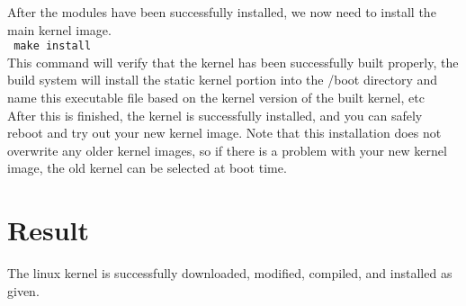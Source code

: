 \documentclass[12pt,a4paper]{article}
\begin{document}
\newline
After the modules have been successfully installed, we now need to install the main kernel image.\\
\newline
\texttt{\ make install}\\
\newline
This command will verify that the kernel has been successfully built properly, the build system will install the static kernel portion into the /boot directory and name this executable file based on the kernel version of the built kernel, etc\\
\newline
After this is finished, the kernel is successfully installed, and you can safely reboot and try out your new kernel image. Note that this installation does not overwrite any older kernel images, so if there is a problem with your new kernel image, the old kernel can be selected at boot time. 

\section{Result}

The linux kernel is successfully downloaded, modified, compiled, and installed as given.
\end{document}
